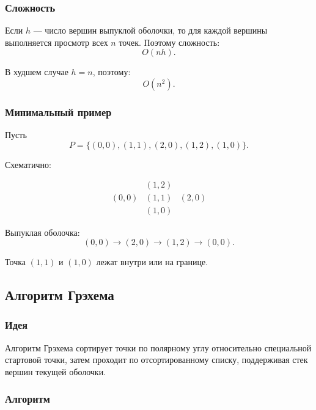 \documentclass[12pt,a4paper]{article}
\begin{document}
\subsubsection{Сложность}

Если \(h\) — число вершин выпуклой оболочки, то для каждой вершины выполняется просмотр всех \(n\) точек. Поэтому сложность:
\[
O(nh).
\]

В худшем случае \(h=n\), поэтому:
\[
O(n^2).
\]

\subsubsection{Минимальный пример}

Пусть
\[
P=\{(0,0),(1,1),(2,0),(1,2),(1,0)\}.
\]

Схематично:

\[
\begin{array}{ccc}
 & (1,2) & \\
(0,0) & (1,1) & (2,0)\\
 & (1,0) &
\end{array}
\]

Выпуклая оболочка:
\[
(0,0)\to(2,0)\to(1,2)\to(0,0).
\]

Точка \((1,1)\) и \((1,0)\) лежат внутри или на границе.

\subsection{Алгоритм Грэхема}

\subsubsection{Идея}

Алгоритм Грэхема сортирует точки по полярному углу относительно специальной стартовой точки, затем проходит по отсортированному списку, поддерживая стек вершин текущей оболочки.

\subsubsection{Алгоритм}
\end{document}
